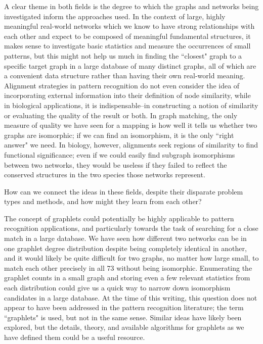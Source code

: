 \documentclass[12pt]{thesis}
\theoremstyle{plain}
\theoremstyle{definition}
\theoremstyle{remark}
\begin{document}
A clear theme in both fields is the degree to which the graphs and networks being investigated inform the approaches used. In the context of large, highly meaningful real-world networks which we know to have strong relationships with each other and expect to be composed of meaningful fundamental structures, it makes sense to investigate basic statistics and measure the occurrences of small patterns, but this might not help us much in finding the ``closest" graph to a specific target graph in a large database of many distinct graphs, all of which are a convenient data structure rather than having their own real-world meaning. Alignment strategies in pattern recognition do not even consider the idea of incorporating external information into their definition of node similarity, while in biological applications, it is indispensable--in constructing a notion of similarity or evaluating the quality of the result or both. In graph matching, the only measure of quality we have seen for a mapping is how well it tells us whether two graphs are isomorphic; if we can find an isomorphism, it is the only ``right answer" we need. In biology, however, alignments seek regions of similarity to find functional significance; even if we could easily find subgraph isomorphisms between two networks, they would be useless if they failed to reflect the conserved structures in the two species those networks represent.

How can we connect the ideas in these fields, despite their disparate problem types and methods, and how might they learn from each other? 

The concept of graphlets could potentially be highly applicable to pattern recognition applications, and particularly towards the task of searching for a close match in a large database. We have seen how different two networks can be in one graphlet degree distribution despite being completely identical in another, and it would likely be quite difficult for two graphs, no matter how large small, to match each other precisely in all 73 without being isomorphic. Enumerating the graphlet counts in a small graph and storing even a few relevant statistics from each distribution could give us a quick way to narrow down isomorphism candidates in a large database. At the time of this writing, this question does not appear to have been addressed in the pattern recognition literature; the term ``graphlets" is used, but not in the same sense. Similar ideas have likely been explored, but the details, theory, and available algorithms for graphlets as we have defined them could be a useful resource.
\end{document}
